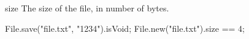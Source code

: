 \begin{urbiscriptapi}
\item[size]
  The size of the file, in number of bytes.
\begin{urbiassert}
File.save("file.txt", "1234").isVoid;
File.new("file.txt").size == 4;
\end{urbiassert}
\end{urbiscriptapi}



